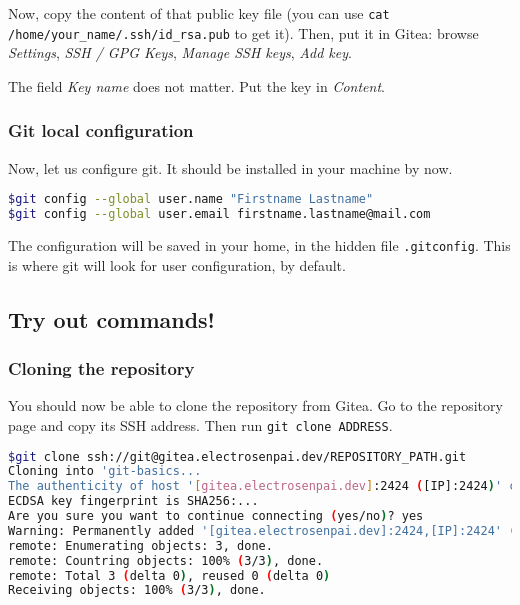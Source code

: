 \documentclass[12pt]{article}
\begin{document}
Now, copy the content of that public key file (you can use \texttt{cat /home/your\_name/.ssh/id\_rsa.pub} to get it). Then, put it in Gitea: browse \textit{Settings}, \textit{SSH / GPG Keys}, \textit{Manage SSH keys}, \textit{Add key}.

The field \textit{Key name} does not matter. Put the key in \textit{Content}.

\subsubsection{Git local configuration}

Now, let us configure git. It should be installed in your machine by now.

\begin{lstlisting}[language=bash]
$git config --global user.name "Firstname Lastname"
$git config --global user.email firstname.lastname@mail.com
\end{lstlisting}

The configuration will be saved in your home, in the hidden file \texttt{.gitconfig}. This is where git will look for user configuration, by default.

\subsection{Try out commands!}

\subsubsection{Cloning the repository}

You should now be able to clone the repository from Gitea. Go to the repository page and copy its SSH address. Then run \texttt{git clone ADDRESS}.

\begin{lstlisting}[language=bash]
$git clone ssh://git@gitea.electrosenpai.dev/REPOSITORY_PATH.git
Cloning into 'git-basics...
The authenticity of host '[gitea.electrosenpai.dev]:2424 ([IP]:2424)' can't be established.
ECDSA key fingerprint is SHA256:...
Are you sure you want to continue connecting (yes/no)? yes
Warning: Permanently added '[gitea.electrosenpai.dev]:2424,[IP]:2424' (ECDSA) to the list of known hosts.
remote: Enumerating objects: 3, done.
remote: Countring objects: 100% (3/3), done.
remote: Total 3 (delta 0), reused 0 (delta 0)
Receiving objects: 100% (3/3), done.
\end{lstlisting}
\end{document}
